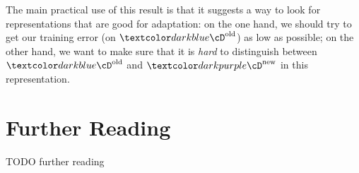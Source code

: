 The main practical use of this result is that it suggests a way to look for representations that are good for adaptation: on the one hand, we should try to get our training error (on $\Dold$) as low as possible; on the other hand, we want to make sure that it is \emph{hard} to distinguish between $\Dold$ and $\Dnew$ in this representation.


\section{Further Reading}

TODO further reading


